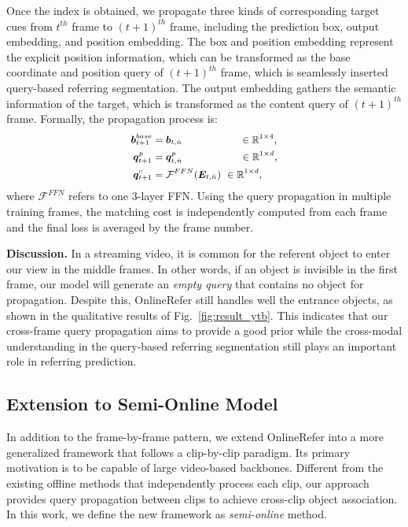 \documentclass[10pt,twocolumn,letterpaper]{article}
\begin{document}
Once the index is obtained,  we propagate three kinds of corresponding target cues from $t^{th}$ frame to ${(t\!+\!1)}^{th}$  frame, including the prediction box, output embedding, and position embedding.
The box and position embedding represent the explicit position information, which can be transformed as the base coordinate and position query of  ${(t\!+\!1)}^{th}$  frame, which is seamlessly inserted query-based referring segmentation.
The output embedding gathers the semantic information of the target, which is transformed as the content query of  ${(t\!+\!1)}^{th}$  frame. Formally, the propagation process is:
\begin{equation}
\label{eq:propagation}
\small
\begin{aligned}
    \bm{b}_{t+1}^{base} &= \bm{b}_{t, \hat{n}} ~~~~~~~~~~~~~~~~~\in \mathbb{R}^{1\times 4}, \\
    \bm{q}_{t+1}^p &= \bm{q}^p_{t, \hat{n} } ~~~~~~~~~~~~~~~~~\in \mathbb{R}^{1\times d}, \\
    \bm{q}_{t+1}^c &= \mathcal{F}^{FFN}(\bm{E}_{t, \hat{n}}) ~\in \mathbb{R}^{1\times d}, \\
\end{aligned}
\end{equation}
where $\mathcal{F}^{FFN}$ refers to one 3-layer FFN.
Using the query propagation in multiple training frames, the matching cost is independently computed from each frame and the final loss is averaged by the frame number.


\noindent\textbf{Discussion.} 
In a streaming video, it is common for the referent object to enter our view in the middle frames.
In other words, if an object is invisible in the first frame, our model will generate an \textit{empty query} that contains no object for propagation.
Despite this, OnlineRefer still handles well the entrance objects, as shown in the qualitative results of Fig.~\ref{fig:result_ytb}.
This indicates that our cross-frame query propagation aims to provide a good prior while the cross-modal understanding in the query-based referring segmentation still plays an important role in referring prediction.



\subsection{Extension to Semi-Online Model}
\label{sec:extension}

In addition to the frame-by-frame pattern,  we extend OnlineRefer into a more generalized framework that follows a clip-by-clip paradigm.
Its primary motivation is to be capable of large video-based backbones. 
Different from the existing offline methods that independently process each clip, our approach provides query propagation between clips to achieve cross-clip object association.
In this work, we define the new framework as \textit{semi-online} method.
\end{document}

